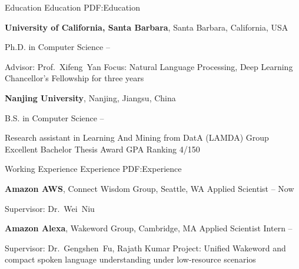 \documentclass[letterpaper,MMMyyyy,nonstopmode]{simpleresumecv}
\begin{document}
\begin{Body}
\Section
{Education}
{Education}
{PDF:Education}

\Entry
\textbf{University of California, Santa Barbara},
Santa Barbara, California, USA

\Gap
\BulletItem
Ph.D. in Computer Science
\hfill
{} -- 
\begin{Detail}
\SubBulletItem
Advisor:
Prof.~Xifeng~Yan
\SubBulletItem
Focus:
Natural Language Processing, Deep Learning
\SubBulletItem
Chancellor's Fellowship for three years
\end{Detail}

\BigGap
\Entry
\textbf{Nanjing University},
Nanjing, Jiangsu, China

\Gap
\BulletItem
B.S. in Computer Science
\hfill
{} --
\begin{Detail}
\SubBulletItem
Research assistant in Learning And Mining from DatA (LAMDA) Group
\SubBulletItem
Excellent Bachelor Thesis Award
\SubBulletItem
GPA Ranking 4/150

\end{Detail}


\Section
{Working Experience}
{Experience}
{PDF:Experience}

\BigGap
\Entry
\textbf{Amazon AWS},
Connect Wisdom Group, Seattle, WA
\BulletItem
Applied Scientist
\hfill
{} --
Now
\begin{Detail}
    \SubBulletItem
    Supervisor: Dr.~Wei~Niu
\end{Detail}

\BigGap
\Entry
\textbf{Amazon Alexa},
Wakeword Group, Cambridge, MA
\BulletItem
Applied Scientist Intern
\hfill
{} --
\begin{Detail}
\SubBulletItem
Supervisor:
Dr.~Gengshen~Fu, Rajath Kumar
\SubBulletItem
Project: Unified Wakeword and compact spoken language understanding under low-resource scenarios


\end{Detail}
\end{Body}
\end{document}
